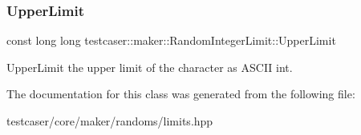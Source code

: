 \subsubsection{\texorpdfstring{UpperLimit}{UpperLimit}}
{\footnotesize\ttfamily const long long testcaser\+::maker\+::\+Random\+Integer\+Limit\+::\+Upper\+Limit}



Upper\+Limit the upper limit of the character as A\+S\+C\+II int. 



The documentation for this class was generated from the following file\+:\begin{DoxyCompactItemize}
\item 
testcaser/core/maker/randoms/limits.\+hpp\end{DoxyCompactItemize}
